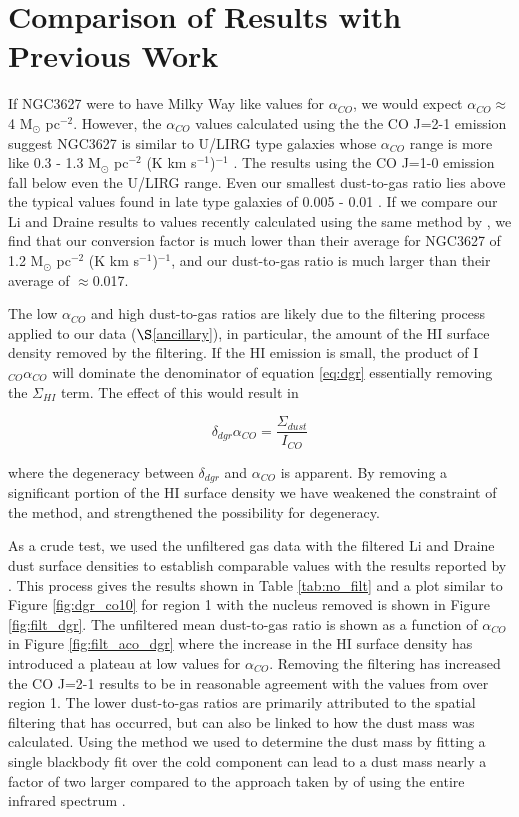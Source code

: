 \section{Comparison of Results with Previous Work}

If NGC3627 were to have Milky Way like values for $\alpha_{CO}$, we would expect $\alpha_{CO}\approx$4 M$_\odot$ pc$^{-2}$\citep{sandstrom2013}.  However, the $\alpha_{CO}$ values calculated using the the CO J=2-1 emission suggest NGC3627 is similar to U/LIRG type galaxies whose $\alpha_{CO}$ range is more like 0.3 - 1.3 M$_\odot$ pc$^{-2}$ (K km s$^{-1}$)$^{-1}$ \citep{downes1998}.  The results using the CO J=1-0 emission fall below even the U/LIRG range.  Even our smallest dust-to-gas ratio lies above the typical values found in late type galaxies of 0.005 - 0.01 \citep{smith2012}.  If we compare our Li and Draine results to values recently calculated using the same method by \cite{sandstrom2013}, we find that our conversion factor is much lower than their average for NGC3627 of 1.2 M$_\odot$ pc$^{-2}$ (K km s$^{-1}$)$^{-1}$, and our dust-to-gas ratio is much larger than their average of $\approx$0.017.  

The low $\alpha_{CO}$ and high dust-to-gas ratios are likely due to the filtering process applied to our data ($\S$\ref{ancillary}), in particular, the amount of the HI surface density removed by the filtering.  If the HI emission is small, the product of I$_{CO}\alpha_{CO}$ will dominate the denominator of equation \ref{eq:dgr} essentially removing the $\Sigma_{HI}$ term.  The effect of this would result in 

\begin{equation}\label{dgr:degen}
  \delta_{dgr}\alpha_{CO} = \frac{\Sigma_{dust}}{I_{CO}}
\end{equation}

\noindent where the degeneracy between $\delta_{dgr}$ and $\alpha_{CO}$ is apparent.  By removing a significant portion of the HI surface density we have weakened the constraint of the method, and strengthened the possibility for degeneracy.

As a crude test, we used the unfiltered gas data with the filtered Li and Draine dust surface densities to establish comparable values with the results reported by \cite{sandstrom2013}.  This process gives the results shown in Table \ref{tab:no_filt} and a plot similar to Figure \ref{fig:dgr_co10} for region 1 with the nucleus removed is shown in Figure \ref{fig:filt_dgr}.  The unfiltered mean dust-to-gas ratio is shown as a function of $\alpha_{CO}$ in Figure \ref{fig:filt_aco_dgr} where the increase in the HI surface density has introduced a plateau at low values for $\alpha_{CO}$.  Removing the filtering has increased the CO J=2-1 results to be in reasonable agreement with the values from \cite{sandstrom2013} over region 1.  The lower dust-to-gas ratios are primarily attributed to the spatial filtering that has occurred, but can also be linked to how the dust mass was calculated.  Using the method we used to determine the dust mass by fitting a single blackbody fit over the cold component can lead to a dust mass nearly a factor of two larger compared to the approach taken by \cite{sandstrom2013} of using the entire infrared spectrum \citep{dale2012}.

